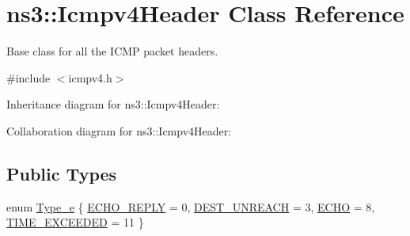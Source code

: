 \hypertarget{classns3_1_1Icmpv4Header}{}\section{ns3\+:\+:Icmpv4\+Header Class Reference}
\label{classns3_1_1Icmpv4Header}


Base class for all the I\+C\+MP packet headers.  




{\ttfamily \#include $<$icmpv4.\+h$>$}



Inheritance diagram for ns3\+:\+:Icmpv4\+Header\+:


Collaboration diagram for ns3\+:\+:Icmpv4\+Header\+:
\subsection*{Public Types}
\begin{DoxyCompactItemize}
\item 
enum \hyperlink{classns3_1_1Icmpv4Header_a274c9ad4ec0e9a3249a370953e83e8aa}{Type\+\_\+e} \{ \hyperlink{classns3_1_1Icmpv4Header_a274c9ad4ec0e9a3249a370953e83e8aaace2d55cf7279c27e31f7001e23d05947}{E\+C\+H\+O\+\_\+\+R\+E\+P\+LY} = 0, 
\hyperlink{classns3_1_1Icmpv4Header_a274c9ad4ec0e9a3249a370953e83e8aaa8aa0a34c4092824b0460040b4165f2d2}{D\+E\+S\+T\+\_\+\+U\+N\+R\+E\+A\+CH} = 3, 
\hyperlink{classns3_1_1Icmpv4Header_a274c9ad4ec0e9a3249a370953e83e8aaa0565a1d9ed24dd02e56eec1e40bfdc49}{E\+C\+HO} = 8, 
\hyperlink{classns3_1_1Icmpv4Header_a274c9ad4ec0e9a3249a370953e83e8aaa826c8c4f5f07bfd79db809d1ff1ecf23}{T\+I\+M\+E\+\_\+\+E\+X\+C\+E\+E\+D\+ED} = 11
 \}
\end{DoxyCompactItemize}
